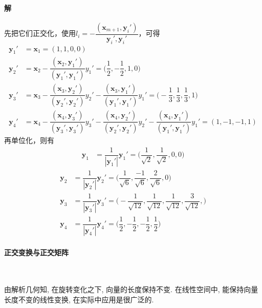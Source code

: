 \paragraph*{解} 先把它们正交化，使用$l_i = -\dfrac{(\bm{x}_{m+1}, \bm{y}_i')}{\bm{y}_i', \bm{y}_i'}$，可得
\begin{align*}
    \bm{y}_1' & = \bm{x}_1 = (1,1, 0 ,0)                                                                                                                                                                                         \\
    \bm{y}_2' & = \bm{x}_2 -\dfrac{(\bm{x}_{2},\bm{y}_1')}{(\bm{y}_1', \bm{y}_1')}y_1' = \bigl(\dfrac{1}{2}, -\dfrac{1}{2}, 1, 0\bigr)                                                                                           \\
    \bm{y}_3' & = \bm{x}_3 -\dfrac{(\bm{x}_{3}, \bm{y}_2')}{(\bm{y}_2', \bm{y}_2')}y_2' -\dfrac{(\bm{x}_{3}, \bm{y}_1')}{(\bm{y}_1', \bm{y}_1')}y_1' = \bigl(-\dfrac{1}{3}, \dfrac{1}{3}, \dfrac{1}{3}, 1\bigr)                  \\
    \bm{y}_4' & = \bm{x}_4 -\dfrac{(\bm{x}_{4},\bm{y}_3')}{(\bm{y}_3', \bm{y}_3')}y_3'-\dfrac{(\bm{x}_{4}, \bm{y}_2')}{(\bm{y}_2', \bm{y}_2')}y_2' -\dfrac{(\bm{x}_{4}, \bm{y}_1')}{(\bm{y}_1', \bm{y}_1')}y_1' = (1, -1, -1, 1)
\end{align*}
再单位化，则有
\begin{align*}
    \bm{y}_1 & = \dfrac{1}{|\bm{y}_1'|}\bm{y}_1' = \bigl(\dfrac{1}{\sqrt{2}}, \dfrac{1}{\sqrt{2}}, 0, 0 \bigr)
\end{align*}
\begin{align*}
    \bm{y}_2 & = \dfrac{1}{|\bm{y}_2'|}\bm{y}_2' = \bigl(\dfrac{1}{\sqrt{6}}, \dfrac{-1}{\sqrt{6}}, \dfrac{2}{\sqrt{6}}, 0\bigr)                         \\
    \bm{y}_3 & = \dfrac{1}{|\bm{y}_3'|}\bm{y}_3' = \bigl(-\dfrac{1}{\sqrt{12}}, \dfrac{1}{\sqrt{12}}, \dfrac{1}{\sqrt{12}}, \dfrac{3}{\sqrt{12}}, \bigr) \\
    \bm{y}_4 & = \dfrac{1}{|\bm{y}_4'|}\bm{y}_4' = \bigl(\dfrac{1}{2}, -\dfrac{1}{2}, -\dfrac{1}{2}, \dfrac{1}{2}\bigr)
\end{align*}

\paragraph[]{正交变换与正交矩阵} \

\par 由解析几何知, 在旋转变化之下, 向量的长度保持不变. 在线性空间中, 能保持向量长度不变的线性变换, 在实际中应用是很广泛的.

